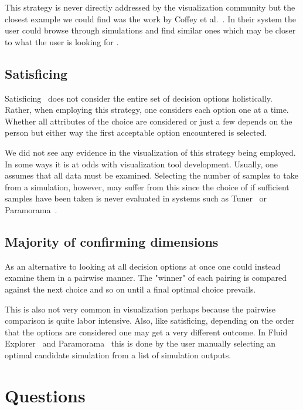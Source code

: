 This strategy is never directly addressed by the visualization community
but the closest example we could find was the work by 
Coffey et al.~\citep{Coffey:2013}. In their system the user could browse
through simulations and find similar ones which may be closer to what
the user is looking for .

\subsection{Satisficing}\label{satisficing}

Satisficing~\cite{ref} does not consider the entire set of decision options
holistically. Rather, when employing this strategy, one considers each 
option one at a time. Whether all attributes of the choice are considered or
just a few depends on the person but either way the first acceptable option
encountered is selected.

We did not see any evidence in the visualization of this strategy being
employed. In some ways it is at odds with visualization tool development.
Usually, one assumes that all data must be examined. Selecting the number
of samples to take from a simulation, however, may suffer from this since
the choice of if sufficient samples have been taken is never evaluated
in systems such as Tuner~\citep{Torsney-Weir:2011} or 
Paramorama~\citep{Pretorious:2011}. 

\subsection{Majority of confirming
dimensions}\label{majority-of-confirming-dimensions}

As an alternative to looking at all decision options at once one could 
instead examine them in a pairwise manner. The "winner" of each pairing is
compared against the next choice and so on until a final optimal choice
prevails.

This is also not very common in visualization perhaps because the pairwise
comparison is quite labor intensive. Also, like satisficing, depending on the
order that the options are considered one may get a very different outcome. In
Fluid Explorer~\cite{Bruckner:2010} and Paramorama~\citep{Pretorious:2011} this
is done by the user manually selecting an optimal candidate simulation from 
a list of simulation outputs.


\section{Questions}\label{questions}

